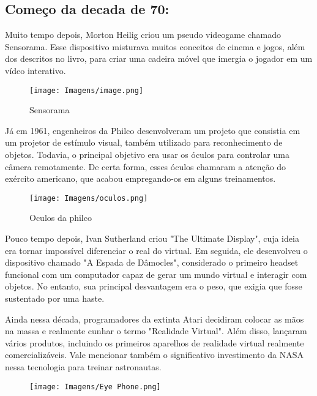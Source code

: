 \documentclass[article,a4paper,12pt,brazil,sumario=tradicional]{abntex2}
\begin{document}
    \subsection{Começo da decada de 70:}
        Muito tempo depois, Morton Heilig criou um pseudo videogame chamado Sensorama. Esse dispositivo misturava muitos conceitos de cinema e jogos, além dos descritos no livro, para criar uma cadeira móvel que imergia o jogador em um vídeo interativo.
        \begin{figure}[H]
            \centering
            \texttt{[image: Imagens/image.png]}
            \caption{Sensorama}
            \label{fig:enter-label}
        \end{figure}
         Já em 1961, engenheiros da Philco desenvolveram um projeto que consistia em um projetor de estímulo visual, também utilizado para reconhecimento de objetos. Todavia, o principal objetivo era usar os óculos para controlar uma câmera remotamente. De certa forma, esses óculos chamaram a atenção do exército americano, que acabou empregando-os em alguns treinamentos.
        \begin{figure}[H]
            \centering
            \texttt{[image: Imagens/oculos.png]}
            \caption{Oculos da philco}
            \label{fig:enter-label}
        \end{figure}
        Pouco tempo depois, Ivan Sutherland criou "The Ultimate Display", cuja ideia era tornar impossível diferenciar o real do virtual. Em seguida, ele desenvolveu o dispositivo chamado "A Espada de Dâmocles", considerado o primeiro headset funcional com um computador capaz de gerar um mundo virtual e interagir com objetos. No entanto, sua principal desvantagem era o peso, que exigia que fosse sustentado por uma haste.
        
        Ainda nessa década, programadores da extinta Atari decidiram colocar as mãos na massa e realmente cunhar o termo "Realidade Virtual". Além disso, lançaram vários produtos, incluindo os primeiros aparelhos de realidade virtual realmente comercializáveis. Vale mencionar também o significativo investimento da NASA nessa tecnologia para treinar astronautas.
            \begin{figure}[H]
                \centering
                \texttt{[image: Imagens/Eye Phone.png]}
                \label{fig:enter-label}
            \end{figure}
\end{document}
